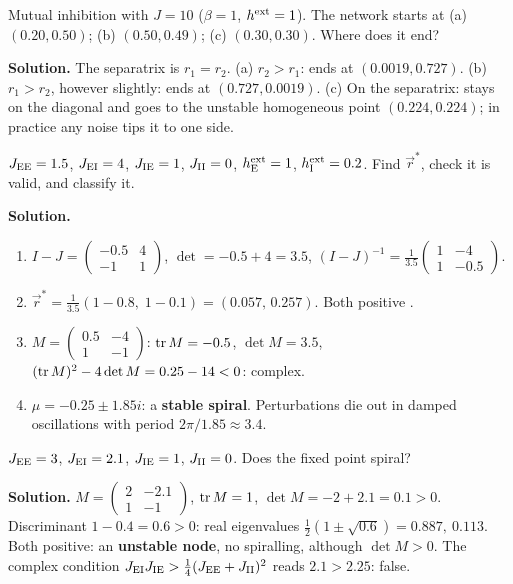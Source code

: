 \begin{example}
Mutual inhibition with $J=10$ ($\beta=1$, $h^{\text{ext}}=1$). The network starts at (a) $(0.20,0.50)$; (b) $(0.50,0.49)$; (c) $(0.30,0.30)$. Where does it end?

\textbf{Solution.} The separatrix is $r_1=r_2$. (a) $r_2>r_1$: ends at $(0.0019,0.727)$. (b) $r_1>r_2$, however slightly: ends at $(0.727,0.0019)$. (c) On the separatrix: stays on the diagonal and goes to the unstable homogeneous point $(0.224,0.224)$; in practice any noise tips it to one side.
\end{example}

\begin{example}
$J_{\mathrm{E}\mathrm{E}}=1.5$, $J_{\mathrm{E}\mathrm{I}}=4$, $J_{\mathrm{I}\mathrm{E}}=1$, $J_{\mathrm{I}\mathrm{I}}=0$, $h_{\mathrm{E}}^{\text{ext}}=1$, $h_{\mathrm{I}}^{\text{ext}}=0.2$. Find $\vec r^*$, check it is valid, and classify it.

\textbf{Solution.}
\begin{enumerate}
  \item $I-J=\begin{pmatrix}-0.5&4\\-1&1\end{pmatrix}$, $\det=-0.5+4=3.5$, $(I-J)^{-1}=\tfrac{1}{3.5}\begin{pmatrix}1&-4\\1&-0.5\end{pmatrix}$.
  \item $\vec r^*=\tfrac1{3.5}(1-0.8,\;1-0.1)=(0.057,\,0.257)$. Both positive \checkmark.
  \item $M=\begin{pmatrix}0.5&-4\\1&-1\end{pmatrix}$: $\operatorname{tr} M=-0.5$, $\det M=3.5$, $(\operatorname{tr} M)^2-4\det M=0.25-14<0$: complex.
  \item $\mu=-0.25\pm1.85i$: a \textbf{stable spiral}. Perturbations die out in damped oscillations with period $2\pi/1.85\approx3.4$.
\end{enumerate}
\end{example}

\begin{example}
$J_{\mathrm{E}\mathrm{E}}=3$, $J_{\mathrm{E}\mathrm{I}}=2.1$, $J_{\mathrm{I}\mathrm{E}}=1$, $J_{\mathrm{I}\mathrm{I}}=0$. Does the fixed point spiral?

\textbf{Solution.} $M=\begin{pmatrix}2&-2.1\\1&-1\end{pmatrix}$, $\operatorname{tr} M=1$, $\det M=-2+2.1=0.1>0$. Discriminant $1-0.4=0.6>0$: real eigenvalues $\tfrac12(1\pm\sqrt{0.6})=0.887,\ 0.113$. Both positive: an \textbf{unstable node}, no spiralling, although $\det M>0$.
The complex condition $J_{\mathrm{E}\mathrm{I}}J_{\mathrm{I}\mathrm{E}}>\frac14(J_{\mathrm{E}\mathrm{E}}+J_{\mathrm{I}\mathrm{I}})^2$ reads $2.1>2.25$: false.
\end{example}

